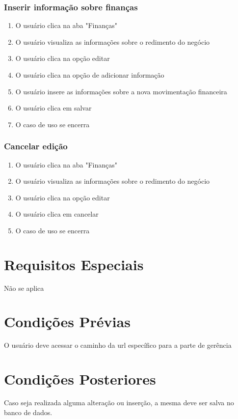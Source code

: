 \subsubsection{Inserir informação sobre finanças}
\begin{enumerate}
	\item O usuário clica na aba "Finanças"
	\item O usuário visualiza as informações sobre o redimento do negócio
	\item O usuário clica na opção editar
	\item O usuário clica na opção de adicionar informação
	\item O usuário insere as informações sobre a nova movimentação financeira
	\item O usuário clica em salvar
	\item O caso de uso se encerra
\end{enumerate}

\subsubsection{Cancelar edição}
\begin{enumerate}
	\item O usuário clica na aba "Finanças"
	\item O usuário visualiza as informações sobre o redimento do negócio
	\item O usuário clica na opção editar
	\item O usuário clica em cancelar
	\item O caso de uso se encerra
\end{enumerate}

\section{Requisitos Especiais}

Não se aplica

\section{Condições Prévias}

O usuário deve acessar o caminho da url específico para a parte de gerência

\section{Condições Posteriores}

Caso seja realizada alguma alteração ou inserção, a mesma deve ser salva no banco de dados.